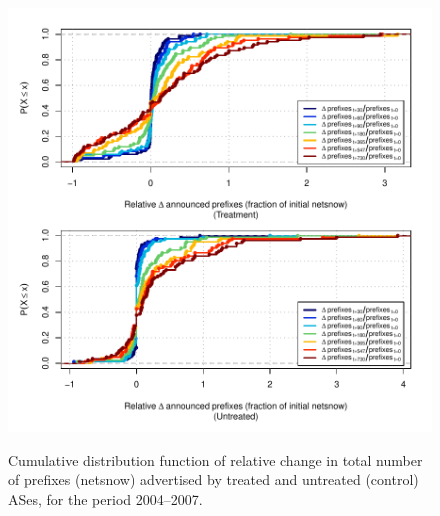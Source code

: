 \begin{figure}[H]
\begin{centering}
\begin{singlespace}
    \includegraphics[width=6in]{figures/behavior-rel_netsnow-2004_2007-corr.pdf}
    \vspace{-2em}\\
    \caption{Cumulative distribution function of relative change in total number of prefixes (netsnow) advertised by treated and untreated (control) ASes, for the period 2004--2007.}
\end{singlespace}
\end{centering}
\end{figure}
